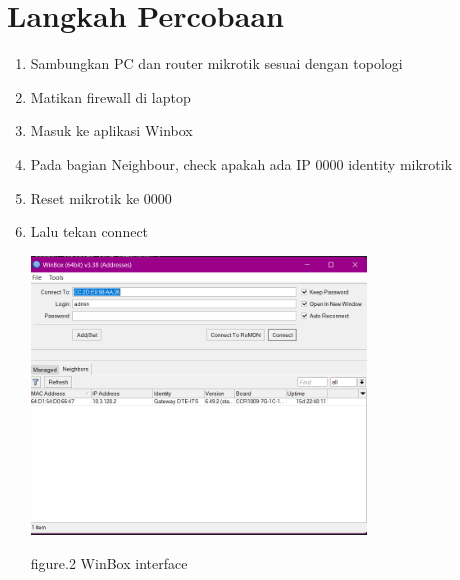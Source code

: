 \section{Langkah Percobaan}
\begin{enumerate}
    \item Sambungkan PC dan router mikrotik sesuai dengan topologi
    \item Matikan firewall di laptop
    \item Masuk ke aplikasi Winbox
    \item Pada bagian Neighbour, check apakah ada IP 0000 identity mikrotik
    \item Reset mikrotik ke 0000
    \item Lalu tekan connect
    
    \begin{center}
        \includegraphics[width=0.7\textwidth]{image/Winbox-interface.png}    
        
        figure.2 WinBox interface
    \end{center}
    

\end{enumerate}
